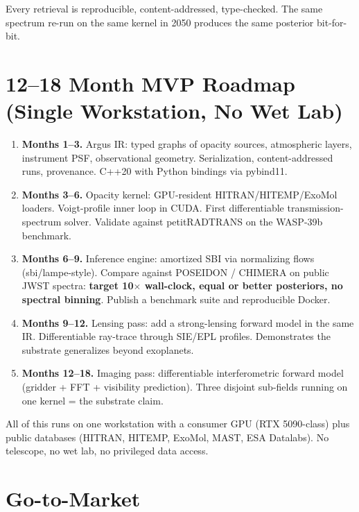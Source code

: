 \documentclass[11pt,a4paper]{article}
\begin{document}
Every retrieval is reproducible, content-addressed, type-checked. The same spectrum re-run on the same kernel in 2050 produces the same posterior bit-for-bit.

\section{12--18 Month MVP Roadmap (Single Workstation, No Wet Lab)}

\begin{enumerate}[leftmargin=1.4em]
  \item \textbf{Months 1--3.} Argus IR: typed graphs of opacity sources, atmospheric layers, instrument PSF, observational geometry. Serialization, content-addressed runs, provenance. C++20 with Python bindings via pybind11.
  \item \textbf{Months 3--6.} Opacity kernel: GPU-resident HITRAN/HITEMP/ExoMol loaders. Voigt-profile inner loop in CUDA. First differentiable transmission-spectrum solver. Validate against petitRADTRANS on the WASP-39b benchmark.
  \item \textbf{Months 6--9.} Inference engine: amortized SBI via normalizing flows (sbi/lampe-style). Compare against POSEIDON / CHIMERA on public JWST spectra: \textbf{target 10$\times$ wall-clock, equal or better posteriors, no spectral binning}. Publish a benchmark suite and reproducible Docker.
  \item \textbf{Months 9--12.} Lensing pass: add a strong-lensing forward model in the same IR. Differentiable ray-trace through SIE/EPL profiles. Demonstrates the substrate generalizes beyond exoplanets.
  \item \textbf{Months 12--18.} Imaging pass: differentiable interferometric forward model (gridder + FFT + visibility prediction). Three disjoint sub-fields running on one kernel = the substrate claim.
\end{enumerate}

All of this runs on one workstation with a consumer GPU (RTX 5090-class) plus public databases (HITRAN, HITEMP, ExoMol, MAST, ESA Datalabs). No telescope, no wet lab, no privileged data access.

\section{Go-to-Market}
\end{document}
